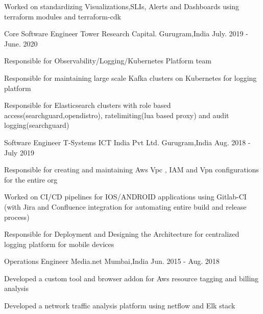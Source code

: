 \begin{cventries}
{\begin{cvitems}
               \item { Worked on standardizing Visualizations,SLIs, Alerts and Dashboards using terraform modules and terraform-cdk} 		
	  \end{cvitems}
    }
    \cventry
    {Core Software Engineer} %
    {Tower Research Capital.} %
    {Gurugram,India} %
    {July. 2019 - June. 2020} %
    {
      \begin{cvitems} %
	             \item { Responsible for Observability/Logging/Kubernetes Platform team }
               \item { Responsible for maintaining large scale Kafka clusters on Kubernetes for logging platform}
               \item { Responsible for Elasticsearch clusters with role based access(searchguard,opendistro), ratelimiting(lua based proxy) and audit logging(searchguard)}
	  \end{cvitems}
    }
    \cventry
    {Software Engineer} %
    {T-Systems ICT India Pvt Ltd.} %
    {Gurugram,India} %
    {Aug. 2018 - July 2019} %
    {
      \begin{cvitems} %
	  \item { Responsible for creating and maintaining Aws Vpc , IAM and Vpn configurations for the entire org}
		\item {Worked on CI/CD pipelines for IOS/ANDROID applications using Gitlab-CI (with Jira and Confluence integration for automating entire build and release process)}
		\item  { Responsible for Deployment and Designing the  Architecture for centralized logging platform for mobile devices}                  
	  \end{cvitems}
    }

  \cventry
    {Operations Engineer} %
    {Media.net} %
    {Mumbai,India} %
    {Jun. 2015 - Aug. 2018} %
    {
      \begin{cvitems} %
	    \item {Developed a custom tool and browser addon for Aws resource tagging and billing analysis }
		  \item {Developed a network traffic analysis platform using netflow and Elk stack }
      \end{cvitems}
    }

\end{cventries}
